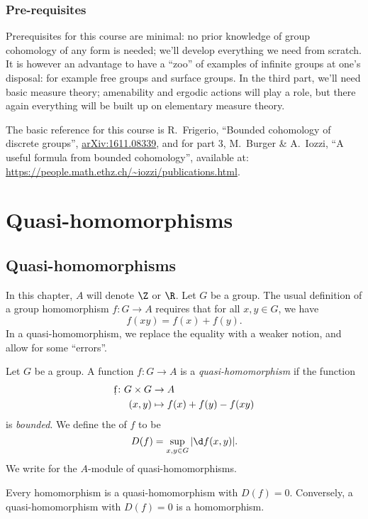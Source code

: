 \documentclass[a4paper]{article}
\newcommand\QH{\mathcal{QH}}
\begin{document}
{\subsubsection*{Pre-requisites}
Prerequisites for this course are minimal: no prior knowledge of group cohomology of any form is needed; we'll develop everything we need from scratch. It is however an advantage to have a ``zoo'' of examples of infinite groups at one's disposal: for example free groups and surface groups. In the third part, we'll need basic measure theory; amenability and ergodic actions will play a role, but there again everything will be built up on elementary measure theory.

The basic reference for this course is R.\ Frigerio, ``Bounded cohomology of discrete groups'', \href{https://arxiv.org/abs/1611.08339}{arXiv:1611.08339}, and for part 3, M.\ Burger \& A.\ Iozzi, ``A useful formula from bounded cohomology'', available at: \url{https://people.math.ethz.ch/~iozzi/publications.html}.%
}
\tableofcontents

\section{Quasi-homomorphisms}
\subsection{Quasi-homomorphisms}
In this chapter, $A$ will denote $\Z$ or $\R$. Let $G$ be a group. The usual definition of a group homomorphism $f\colon G \to A$ requires that for all $x, y \in G$, we have
\[
  f(xy) = f(x) + f(y).
\]
In a quasi-homomorphism, we replace the equality with a weaker notion, and allow for some ``errors''.

\begin{defi}
  Let $G$ be a group. A function $f\colon G \to A$ is a \emph{quasi-homomorphism} if the function
  \begin{align*}
    \d f\colon G \times G &\to A\\
    (x, y) &\mapsto f(x) + f(y) - f(xy)
  \end{align*}
  is \emph{bounded}. We define the  of $f$ to be
  \[
    D(f) = \sup_{x, y \in G} |\d f(x, y)|.
  \]
  We write \term{$\QH(G, A)$} for the $A$-module of quasi-homomorphisms.
\end{defi}

\begin{eg}
  Every homomorphism is a quasi-homomorphism with $D(f) = 0$. Conversely, a quasi-homomorphism with $D(f) = 0$ is a homomorphism.
\end{eg}
\end{document}
